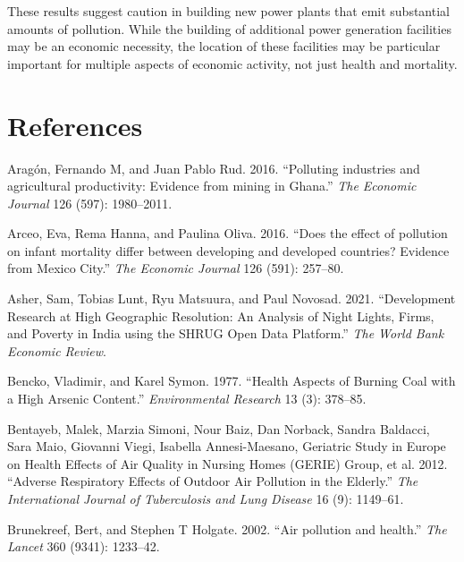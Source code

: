 \documentclass[
]{article}
\newlength{\cslhangindent}
\newlength{\cslentryspacingunit} %
\newenvironment{CSLReferences}[2] %
 {%
  \setlength{\parindent}{0pt}
  \ifodd #1
  \let\oldpar\par
  \def\par{\hangindent=\cslhangindent\oldpar}
  \fi
  \setlength{\parskip}{#2\cslentryspacingunit}
 }%
 {}
\begin{document}
These results suggest caution in building new power plants that emit substantial amounts of pollution. While the building of additional power generation facilities may be an economic necessity, the location of these facilities may be particular important for multiple aspects of economic activity, not just health and mortality.

\FloatBarrier
\newpage
\singlespacing

\hypertarget{references}{%
\section*{References}\label{references}}

\hypertarget{refs}{}
\begin{CSLReferences}{1}{0}
\leavevmode{}%
Aragón, Fernando M, and Juan Pablo Rud. 2016. {``{Polluting industries and agricultural productivity: Evidence from mining in Ghana}.''} \emph{{The Economic Journal}} 126 (597): 1980--2011.

\leavevmode{}%
Arceo, Eva, Rema Hanna, and Paulina Oliva. 2016. {``{Does the effect of pollution on infant mortality differ between developing and developed countries? Evidence from Mexico City}.''} \emph{{The Economic Journal}} 126 (591): 257--80.

\leavevmode{}%
Asher, Sam, Tobias Lunt, Ryu Matsuura, and Paul Novosad. 2021. {``{Development Research at High Geographic Resolution: An Analysis of Night Lights, Firms, and Poverty in India using the SHRUG Open Data Platform}.''} \emph{{The World Bank Economic Review}}.

\leavevmode{}%
Bencko, Vladimir, and Karel Symon. 1977. {``Health Aspects of Burning Coal with a High Arsenic Content.''} \emph{{Environmental Research}} 13 (3): 378--85.

\leavevmode{}%
Bentayeb, Malek, Marzia Simoni, Nour Baiz, Dan Norback, Sandra Baldacci, Sara Maio, Giovanni Viegi, Isabella Annesi-Maesano, Geriatric Study in Europe on Health Effects of Air Quality in Nursing Homes (GERIE) Group, et al. 2012. {``Adverse Respiratory Effects of Outdoor Air Pollution in the Elderly.''} \emph{{The International Journal of Tuberculosis and Lung Disease}} 16 (9): 1149--61.

\leavevmode{}%
Brunekreef, Bert, and Stephen T Holgate. 2002. {``{Air pollution and health}.''} \emph{{The Lancet}} 360 (9341): 1233--42.


\end{CSLReferences}
\end{document}
